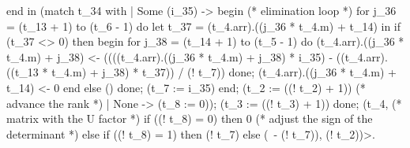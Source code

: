 \documentclass{elsart}
\begin{document}
\begin{code2}
     end in
    (match t_34 with
     | Some (i_35) ->
        begin (* elimination loop *)
         for j_36 = (t_13 + 1) to (t_6 - 1) do
          let t_37 = (t_4.arr).((j_36 * t_4.m) + t_14) in
          if (t_37 <> 0) then begin
           for j_38 = (t_14 + 1) to (t_5 - 1) do
            (t_4.arr).((j_36 * t_4.m) + j_38) <-
             ((((t_4.arr).((j_36 * t_4.m) + j_38) * i_35) -
                ((t_4.arr).((t_13 * t_4.m) + j_38) * t_37)) / (! t_7))
           done;
           (t_4.arr).((j_36 * t_4.m) + t_14) <- 0
          end else ()
         done;
         (t_7 := i_35)
        end;
        (t_2 := ((! t_2) + 1)) (* advance the rank *)
     | None -> (t_8 := 0));
    (t_3 := ((! t_3) + 1))
   done;
   (t_4, (* matrix with the U factor *)
    if ((! t_8) = 0) then 0 (* adjust the sign of the determinant *)
    else if ((! t_8) = 1) then (! t_7)
    else (~- (! t_7)), (! t_2))>.
\end{code2}
\end{document}

